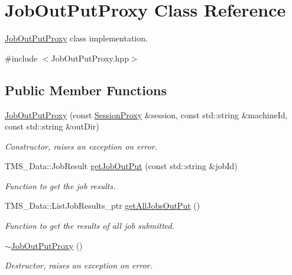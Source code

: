 \hypertarget{classJobOutPutProxy}{
\section{JobOutPutProxy Class Reference}
\label{classJobOutPutProxy}
}


\hyperlink{classJobOutPutProxy}{JobOutPutProxy} class implementation.  




{\ttfamily \#include $<$JobOutPutProxy.hpp$>$}

\subsection*{Public Member Functions}
\begin{DoxyCompactItemize}
\item 
\hyperlink{classJobOutPutProxy_afbbc12843cc8190bfddeb40f90d296cb}{JobOutPutProxy} (const \hyperlink{classSessionProxy}{SessionProxy} \&session, const std::string \&machineId, const std::string \&outDir)
\begin{DoxyCompactList}\small\item\em Constructor, raises an exception on error. \item\end{DoxyCompactList}\item 
TMS\_\-Data::JobResult \hyperlink{classJobOutPutProxy_a5530ecd609a5946165e32934d5a5880c}{getJobOutPut} (const std::string \&jobId)
\begin{DoxyCompactList}\small\item\em Function to get the job results. \item\end{DoxyCompactList}\item 
TMS\_\-Data::ListJobResults\_\-ptr \hyperlink{classJobOutPutProxy_a8cca32ed991e7d30143302612ac1bc0f}{getAllJobsOutPut} ()
\begin{DoxyCompactList}\small\item\em Function to get the results of all job submitted. \item\end{DoxyCompactList}\item 
\hypertarget{classJobOutPutProxy_a3df8bc7ea259e9612a669da59b63c4fa}{
\hyperlink{classJobOutPutProxy_a3df8bc7ea259e9612a669da59b63c4fa}{$\sim$JobOutPutProxy} ()}
\label{classJobOutPutProxy_a3df8bc7ea259e9612a669da59b63c4fa}

\begin{DoxyCompactList}\small\item\em Destructor, raises an exception on error. \item\end{DoxyCompactList}\end{DoxyCompactItemize}
